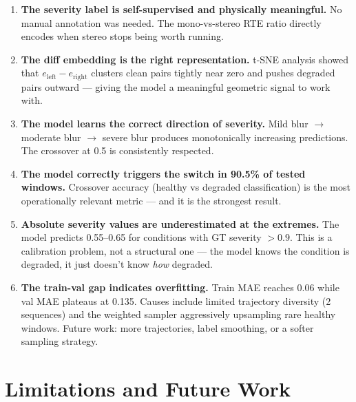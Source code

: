 \documentclass[11pt, a4paper]{article}
\begin{document}
\begin{enumerate}

    \item \textbf{The severity label is self-supervised and physically meaningful.}
          No manual annotation was needed. The mono-vs-stereo RTE ratio directly
          encodes when stereo stops being worth running.

    \item \textbf{The diff embedding is the right representation.}
          t-SNE analysis showed that $e_{\text{left}} - e_{\text{right}}$
          clusters clean pairs tightly near zero and pushes degraded pairs
          outward — giving the model a meaningful geometric signal to work with.

    \item \textbf{The model learns the correct direction of severity.}
          Mild blur $\to$ moderate blur $\to$ severe blur produces monotonically
          increasing predictions. The crossover at 0.5 is consistently respected.

    \item \textbf{The model correctly triggers the switch in 90.5\% of tested windows.}
          Crossover accuracy (healthy vs degraded classification) is the most
          operationally relevant metric --- and it is the strongest result.

    \item \textbf{Absolute severity values are underestimated at the extremes.}
          The model predicts 0.55--0.65 for conditions with GT severity $>0.9$.
          This is a calibration problem, not a structural one --- the model knows
          the condition is degraded, it just doesn't know \textit{how} degraded.

    \item \textbf{The train-val gap indicates overfitting.}
          Train MAE reaches 0.06 while val MAE plateaus at 0.135. Causes include
          limited trajectory diversity (2 sequences) and the weighted sampler
          aggressively upsampling rare healthy windows. Future work: more
          trajectories, label smoothing, or a softer sampling strategy.

\end{enumerate}

\section{Limitations and Future Work}
\end{document}
